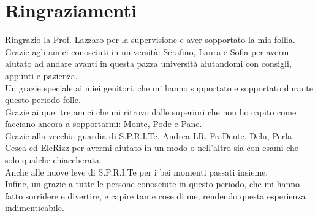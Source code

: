 \chapter{Ringraziamenti} 
Ringrazio la Prof. Lazzaro per la supervisione e aver sopportato la mia follia.\\
Grazie agli amici conosciuti in università: Serafino, Laura e Sofia per avermi aiutato ad andare avanti in questa pazza università aiutandomi con consigli, appunti e pazienza.\\
Un grazie speciale ai miei genitori, che mi hanno supportato e sopportato durante questo periodo folle.\\
Grazie ai quei tre amici che mi ritrovo dalle superiori che non ho capito come facciano ancora a sopportarmi: Monte, Pode e Pane.\\
Grazie alla vecchia guardia di S.P.R.I.Te, Andrea LR, FraDente, Delu, Perla, Cesca ed EleRizz per avermi aiutato in un modo o nell'altro sia con esami che solo qualche chiaccherata.\\
Anche alle nuove leve di S.P.R.I.Te per i bei momenti passati insieme.\\
Infine, un grazie a tutte le persone conosciute in questo periodo, che mi hanno fatto sorridere e divertire, e capire tante cose di me, rendendo questa esperienza indimenticabile.
